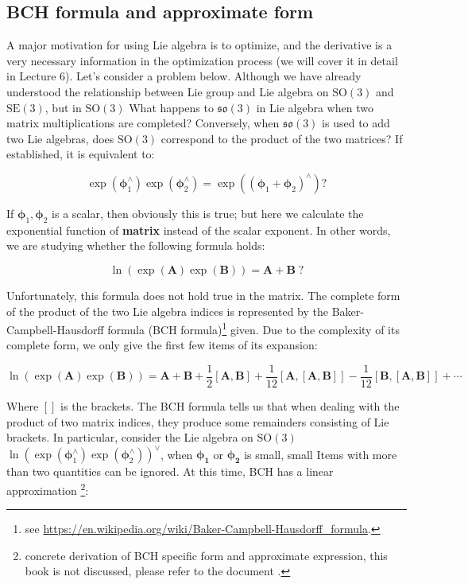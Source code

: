 \subsection{BCH formula and approximate form}

A major motivation for using Lie algebra is to optimize, and the derivative is a very necessary information in the optimization process (we will cover it in detail in Lecture 6). Let's consider a problem below. Although we have already understood the relationship between Lie group and Lie algebra on $\mathrm{SO}(3)$ and $\mathrm{SE}(3)$, but in $\mathrm{SO}(3)$ What happens to $\mathfrak{so}(3)$ in Lie algebra when two matrix multiplications are completed? Conversely, when $\mathfrak{so}(3)$ is used to add two Lie algebras, does $\mathrm{SO}(3)$ correspond to the product of the two matrices? If established, it is equivalent to:

\[
\exp \left( {\boldsymbol{\phi} _1^ \wedge } \right)\exp \left( {\boldsymbol{\phi} _2^ \wedge } \right) = \exp \left( {{{\left( {{\boldsymbol{\phi} _1} + {\boldsymbol{\phi} _2}} \right)}^ \wedge }} \right) ?
\]

If $\boldsymbol{\phi}_1, \boldsymbol{\phi}_2$ is a scalar, then obviously this is true; but here we calculate the exponential function of \textbf{matrix} instead of the scalar exponent. In other words, we are studying whether the following formula holds:

\[
\ln \left( \exp \left( \bm{A} \right) \exp \left( \bm{B} \right) \right) = \bm{A} + \bm{B} \; ?
\]

Unfortunately, this formula does not hold true in the matrix. The complete form of the product of the two Lie algebra indices is represented by the Baker-Campbell-Hausdorff formula (BCH formula)\footnote{ see \url{https://en.wikipedia.org/wiki/Baker-Campbell-Hausdorff\_formula}. } given. Due to the complexity of its complete form, we only give the first few items of its expansion:

\begin{equation}
\ln \left( {\exp \left( \bm{A} \right)\exp \left( \bm{B} \right)} \right) = \bm{A} + \bm{B} + \frac{1}{2}\left[ {\bm{A}, \bm{B}} \right] + \frac{1}{{12}}\left[ {\bm{A},\left[ {\bm{A}, \bm{B}} \right]} \right] - \frac{1}{{12}}\left[ {\bm{B},\left[ {\bm{A},\bm{B}} \right]} \right] +  \cdots 
\end{equation}

Where $[]$ is the brackets. The BCH formula tells us that when dealing with the product of two matrix indices, they produce some remainders consisting of Lie brackets. In particular, consider the Lie algebra on $\mathrm{SO}(3)$$\ln { \left( {\exp \left( { \boldsymbol{\phi} _1^ \wedge } \right)\exp \left ( {\boldsymbol{\phi} _2^ \wedge } \right)} \right) ^ \vee }$, when $\boldsymbol{\phi_1}$ or $\boldsymbol{\phi_2}$ is small, small Items with more than two quantities can be ignored. At this time, BCH has a linear approximation \footnote{ concrete derivation of BCH specific form and approximate expression, this book is not discussed, please refer to the document \cite{Barfoot2016}. }:


